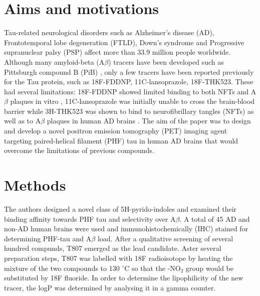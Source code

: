 \documentclass[11pt,a4paper,oneside]{report}
\begin{document}




\section*{Aims and motivations}

Tau-related neurological disorders such as Alzheimer's disease (AD), Frontotemporal lobe degeneration (FTLD), Down's syndrome and Progressive supranuclear palsy (PSP) affect more than 33.9 million people worldwide. \cite{barnes2011projected} Although many amyloid-beta (A$\beta$) tracers have been developed such as Pittsburgh compound B (PiB) \cite{klunk2004imaging}, only a few tracers have been reported previously for the Tau protein, such as 18F-FDDNP\cite{barrio1999pet}, 11C-lansoprazole\cite{rojo2010selective}, 18F-THK523\cite{fodero201118f}. These had several limitations: 18F-FDDNP showed limited binding to both NFTs and A$\beta$ plaques in vitro \cite{thompson2009interaction}, 11C-lansoprazole was initially unable to cross the brain-blood barrier \cite{shao2012evaluation} while 3H-THK523 was shown to bind to neurofibrillary tangles (NFTs) as well as to A$\beta$ plaques in human AD brains \cite{zeng20128invitro}. The aim of the paper was to design and develop a novel positron emission tomography (PET) imaging agent targeting paired-helical filament (PHF) tau in human AD brains that would overcome the limitations of previous compounds.

\section*{Methods}

The authors designed a novel class of 5H-pyrido-indoles and examined their binding affinity towards PHF tau and selectivity over A$\beta$. A total of 45 AD and non-AD human brains were used and immunohistochemically (IHC) stained for determining PHF-tau and A$\beta$ load. After a qualitative screening of several hundred compunds, T807 emerged as the lead candidate. Aster several preparation steps, T807 was labelled with 18F radioisotope by heating the mixture of the two compounds to 130 $^{\circ}$C so that the -NO$_2$ group would be substituted by 18F fluoride. In order to determine the lipophilicity of the new tracer, the logP was determined by analysing it in a gamma counter. 
\end{document}
